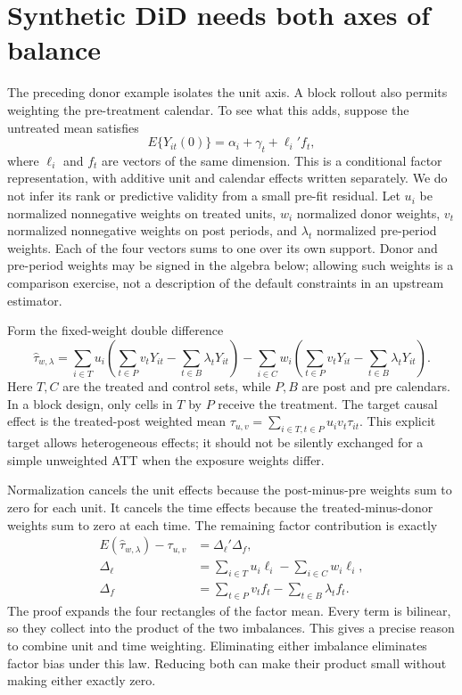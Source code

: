 \section{Synthetic DiD needs both axes of balance}
\label{exec17:s6-sdid}

The preceding donor example isolates the unit axis. A block rollout also
permits weighting the pre-treatment calendar. To see what this adds, suppose
the untreated mean satisfies
\begin{equation}
 E\{Y_{it}(0)\}=\alpha_i+\gamma_t+\ell_i'f_t,
 \label{exec17:s6-factor-law}
\end{equation}
where $\ell_i$ and $f_t$ are vectors of the same dimension. This is a
conditional factor representation, with additive unit and calendar effects
written separately. We do not infer its rank or predictive validity from a
small pre-fit residual. Let $u_i$ be normalized nonnegative weights on
treated units, $w_i$ normalized donor weights, $v_t$ normalized
nonnegative weights on post periods, and $\lambda_t$ normalized
pre-period weights. Each of the four vectors sums to one over its own
support. Donor and pre-period weights may be signed in the algebra below;
allowing such weights is a comparison exercise, not a description of the
default constraints in an upstream estimator.

Form the fixed-weight double difference
\begin{equation}
 \widehat\tau_{w,\lambda}
 =\sum_{i\in T}u_i\left(\sum_{t\in P}v_tY_{it}
                         -\sum_{t\in B}\lambda_tY_{it}\right)
 -\sum_{i\in C}w_i\left(\sum_{t\in P}v_tY_{it}
                         -\sum_{t\in B}\lambda_tY_{it}\right).
 \label{exec17:s6-double-difference}
\end{equation}
Here $T,C$ are the treated and control sets, while $P,B$ are post and
pre calendars. In a block design, only cells in $T$ by $P$ receive the
treatment. The target causal effect is the treated-post weighted mean
$\tau_{u,v}=\sum_{i\in T,t\in P}u_iv_t\tau_{it}$. This explicit target
allows heterogeneous effects; it should not be silently exchanged for a
simple unweighted ATT when the exposure weights differ.

Normalization cancels the unit effects because the post-minus-pre weights
sum to zero for each unit. It cancels the time effects because the
treated-minus-donor weights sum to zero at each time. The remaining
factor contribution is exactly
\begin{align}
 E(\widehat\tau_{w,\lambda})-\tau_{u,v}
 &=\Delta_\ell'\Delta_f,\label{exec17:s6-imbalance-product}\\
 \Delta_\ell&=\sum_{i\in T}u_i\ell_i-\sum_{i\in C}w_i\ell_i,\nonumber\\
 \Delta_f&=\sum_{t\in P}v_tf_t-\sum_{t\in B}\lambda_tf_t.\nonumber
\end{align}
The proof expands the four rectangles of the factor mean. Every term is
bilinear, so they collect into the product of the two imbalances.
This gives a precise reason to combine unit and time weighting. Eliminating
either imbalance eliminates factor bias under this law. Reducing both can
make their product small without making either exactly zero.


